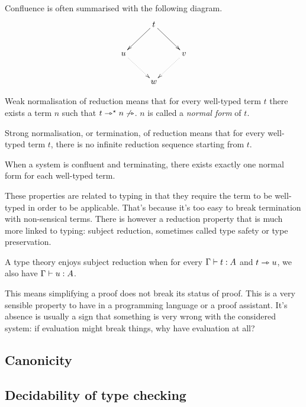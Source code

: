 Confluence is often summarised with the following diagram.
\[
  \xymatrix{
    & t \ar[ld] \ar[rd] & \\
    u \ar@{.>}[rd] && v \ar@{.>}[ld] \\
    & w &
  }
\]

\begin{definition}
  Weak normalisation of reduction means that for every well-typed term \(t\)
  there exists a term \(n\) such that \(t \rightarrowtriangle^{\star} n \not\rightarrowtriangle\).
  \(n\) is called a \emph{normal form} of \(t\).
\end{definition}

\begin{definition}
  Strong normalisation, or termination, of reduction means that for every
  well-typed term \(t\), there is no infinite reduction sequence starting from
  \(t\).
\end{definition}

When a system is confluent and terminating, there exists exactly one normal form
for each well-typed term.

These properties are related to typing in that they require the term to be
well-typed in order to be applicable. That's because it's too easy to break
termination with non-sensical terms.
There is however a reduction property that is much more linked to typing:
subject reduction, sometimes called type safety or type preservation.

\begin{definition}
  A type theory enjoys subject reduction when for every \(\Gamma \vdash t : A\)
  and \(t \rightarrowtriangle u\), we also have \(\Gamma \vdash u : A\).
\end{definition}

This means simplifying a proof does not break its status of proof. This is a
very sensible property to have in a programming language or a proof assistant.
It's absence is usually a sign that something is very wrong with the considered
system: if evaluation might break things, why have evaluation at all?

\subsection{Canonicity}

\subsection{Decidability of type checking}

